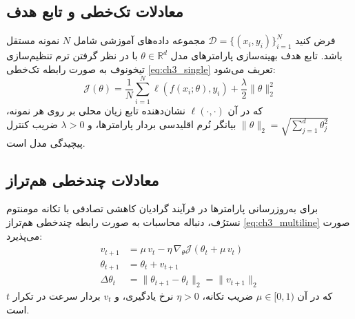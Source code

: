 \subsection{معادلات تک‌خطی و تابع هدف}
فرض کنید $\mathcal{D} = \{(x_i, y_i)\}_{i=1}^{N}$ مجموعه داده‌های آموزشی شامل $N$ نمونه مستقل باشد. تابع هدف بهینه‌سازی پارامترهای مدل $\theta \in \mathbb{R}^d$ با در نظر گرفتن ترم تنظیم‌سازی تیخونوف به صورت رابطه تک‌خطی \eqref{eq:ch3_single} تعریف می‌شود:
\begin{equation}
\label{eq:ch3_single}
\mathcal{J}(\theta) = \frac{1}{N} \sum_{i=1}^{N} \ell\left(f(x_i; \theta), y_i\right) + \frac{\lambda}{2} \|\theta\|_2^2
\end{equation}
که در آن $\ell(\cdot, \cdot)$ نشان‌دهنده تابع زیان محلی بر روی هر نمونه، $\|\theta\|_2 = \sqrt{\sum_{j=1}^d \theta_j^2}$ بیانگر نُرم اقلیدسی بردار پارامترها، و $\lambda > 0$ ضریب کنترل پیچیدگی مدل است.

\subsection{معادلات چندخطی هم‌تراز}
برای به‌روزرسانی پارامترها در فرآیند گرادیان کاهشی تصادفی با تکانه مومنتوم نسترُف، دنباله محاسبات به صورت رابطه چندخطی هم‌تراز \eqref{eq:ch3_multiline} صورت می‌پذیرد:
\begin{align}
\label{eq:ch3_multiline}
v_{t+1} &= \mu \, v_t - \eta \, \nabla_{\theta} \mathcal{J}\left(\theta_t + \mu \, v_t\right) \\
\theta_{t+1} &= \theta_t + v_{t+1} \\
\Delta \theta_t &= \|\theta_{t+1} - \theta_t\|_2 = \|v_{t+1}\|_2
\end{align}
که در آن $\mu \in [0, 1)$ ضریب تکانه، $\eta > 0$ نرخ یادگیری، و $v_t$ بردار سرعت در تکرار $t$ است.


